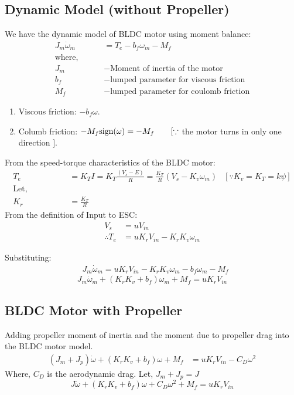 \subsection{Dynamic Model (without Propeller)}
We have the dynamic model of BLDC motor using moment balance:
\begin{align*}
    J_m \dot \omega_m &= T_e - b_f \omega_m - M_f\\
    \text{where, } \qquad &\\
    J_m &- \text{Moment of inertia of the motor}\\
    b_f &- \text{lumped parameter for viscous friction}\\
    M_f &- \text{lumped parameter for coulomb friction}
\end{align*}
\begin{enumerate}
    \item Viscous friction: $-b_f \omega$.
    \item Columb friction: $-M_{f} \text{sign}(\omega) = -M_{f} \qquad [\because$ the motor turns in only one direction $]$.
\end{enumerate}

\medskip

From the speed-torque characteristics of the BLDC motor:
\begin{align*}
    T_e &= K_T I = K_T \frac{(V_s - E)}{R} = \frac{K_T}{R} (V_s - K_v \omega_m)  & [\because K_v = K_T = k \psi]\\
    \text{Let, }\qquad \qquad &\\
    K_r &= \frac{K_T}{R}
\end{align*}
From the definition of Input to ESC:
\begin{align*}
    V_s &= u V_{in}\\
    \therefore T_e &= u K_r V_{in} - K_r K_v \omega_m
\end{align*}

Substituting:
\begin{align*}
    &J_m \dot \omega_m = u K_r V_{in}  - K_rK_v \omega_m  - b_f \omega_m - M_f
\end{align*}
\begin{equation}
    \boxed{
    J_m \dot \omega_m + (K_r K_v  + b_f) \omega_m + M_f = u K_r V_{in}
    }
\end{equation}

\subsection{BLDC Motor with Propeller}
Adding propeller moment of inertia and the moment due to propeller drag into the BLDC motor model.
\begin{align*}
    (J_m + J_p) \dot \omega + (K_rK_v + b_f) \omega + M_f &= u K_r V_{in} - C_D \omega^2
\end{align*}
Where, $C_D$ is the aerodynamic drag. Let, $J_m + J_p = J$
\begin{equation}
    \boxed{
    J\dot \omega + (K_rK_v + b_f) \omega + C_D \omega^2 + M_f = u K_r V_{in}
    }
\end{equation}


